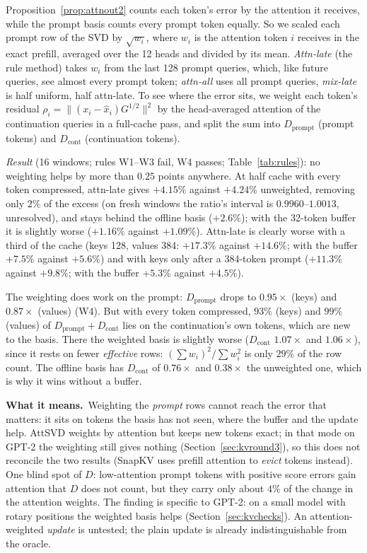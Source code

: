\documentclass[10pt]{article}
\theoremstyle{plain}
\theoremstyle{definition}
\theoremstyle{remark}
\newcommand{\means}{\noindent\textbf{What it means.}\ }
\newcommand{\rl}[1]{\textsf{#1}}%
\begin{document}
Proposition~\ref{prop:attnout2} counts each token's error by the attention it receives, while the prompt basis counts every prompt token equally. So we scaled each prompt row of the SVD by $\sqrt{w_i}$, where $w_i$ is the attention token $i$ receives in the exact prefill, averaged over the 12 heads and divided by its mean. \emph{Attn-late} (the rule method) takes $w_i$ from the last 128 prompt queries, which, like future queries, see almost every prompt token; \emph{attn-all} uses all prompt queries, \emph{mix-late} is half uniform, half attn-late. To see where the error sits, we weight each token's residual $\rho_i=\lVert(x_i-\hat x_i)G^{1/2}\rVert^2$ by the head-averaged attention of the continuation queries in a full-cache pass, and split the sum into $D_{\mathrm{prompt}}$ (prompt tokens) and $D_{\mathrm{cont}}$ (continuation tokens).

\emph{Result} (16 windows; rules \rl{W1}--\rl{W3} fail, \rl{W4} passes; Table~\ref{tab:rules}): no weighting helps by more than $0.25$ points anywhere. At half cache with every token compressed, attn-late gives $+4.15\%$ against $+4.24\%$ unweighted, removing only $2\%$ of the excess (on fresh windows the ratio's interval is $0.9960$--$1.0013$, unresolved), and stays behind the offline basis ($+2.6\%$); with the 32-token buffer it is slightly worse ($+1.16\%$ against $+1.09\%$). Attn-late is clearly worse with a third of the cache (keys 128, values 384: $+17.3\%$ against $+14.6\%$; with the buffer $+7.5\%$ against $+5.6\%$) and with keys only after a 384-token prompt ($+11.3\%$ against $+9.8\%$; with the buffer $+5.3\%$ against $+4.5\%$).

The weighting does work on the prompt: $D_{\mathrm{prompt}}$ drops to $0.95\times$ (keys) and $0.87\times$ (values) (\rl{W4}). But with every token compressed, $93\%$ (keys) and $99\%$ (values) of $D_{\mathrm{prompt}}+D_{\mathrm{cont}}$ lies on the continuation's own tokens, which are new to the basis. There the weighted basis is slightly worse ($D_{\mathrm{cont}}$ $1.07\times$ and $1.06\times$), since it rests on fewer \emph{effective} rows: $(\sum w_i)^2/\sum w_i^2$ is only $29\%$ of the row count. The offline basis has $D_{\mathrm{cont}}$ of $0.76\times$ and $0.38\times$ the unweighted one, which is why it wins without a buffer.

\means Weighting the \emph{prompt} rows cannot reach the error that matters: it sits on tokens the basis has not seen, where the buffer and the update help. AttSVD \cite{attsvd2026} weights by attention but keeps new tokens exact; in that mode on GPT-2 the weighting still gives nothing (Section~\ref{sec:kvround3}), so this does not reconcile the two results (SnapKV \cite{li2024snapkv} uses prefill attention to \emph{evict} tokens instead). One blind spot of $D$: low-attention prompt tokens with positive score errors gain attention that $D$ does not count, but they carry only about $4\%$ of the change in the attention weights. The finding is specific to GPT-2: on a small model with rotary positions the weighted basis helps (Section~\ref{sec:kvchecks}). An attention-weighted \emph{update} is untested; the plain update is already indistinguishable from the oracle.
\end{document}
